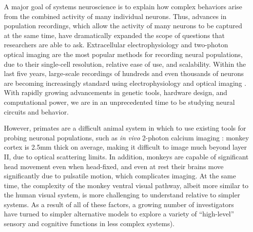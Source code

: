 
A major goal of systems neuroscience is to explain how complex behaviors arise from the combined activity of many individual neurons. Thus, advances in population recordings, which allow the activity of many neurons to be captured at the same time, have dramatically expanded the scope of questions that researchers are able to ask. Extracellular electrophysiology and two-photon optical imaging are the most popular methods for recording neural populations, due to their single-cell resolution, relative ease of use, and scalability. Within the last five years, large-scale recordings of hundreds and even thousands of neurons are becoming increasingly standard using electrophysiology \cite{Steinmetz2019, Siegle2021} and optical imaging \cite{Stringer2019a, Weisenburger2019, Sofroniew2016}. With rapidly growing advancements in genetic tools, hardware design, and computational power, we are in an unprecedented time to be studying neural circuits and behavior. 

However, primates are a difficult animal system in which to use existing tools for probing neuronal populations, such as \textit{in vivo} 2-photon calcium imaging \cite{Ohki2005}: monkey cortex is 2.5mm thick on average\cite{Koo2012}, making it difficult to image much beyond layer II, due to optical scattering limits. In addition, monkeys are capable of significant head movement even when head-fixed, and even at rest their brains move significantly due to pulsatile motion, which complicates imaging. At the same time, the complexity of the monkey ventral visual pathway, albeit more similar to the human visual system, is more challenging to understand relative to simpler systems. As a result of all of these factors, a growing number of investigators have turned to simpler alternative models to explore a variety of ``high-level'' sensory and cognitive functions in less complex systems\cite{Brunton2013, Miller2017TwoStep, Aronov2014, Glickfeld2017}).


